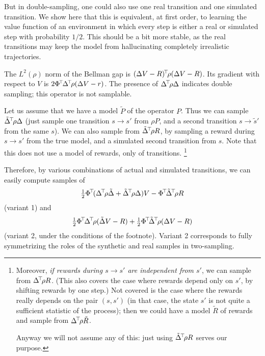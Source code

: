 \documentclass[11pt,a4paper]{article}
\begin{document}
But in double-sampling, one could also use one real transition and one
simulated transition. We show here that this is equivalent, at first order,
to learning the value function of an environment in which every step is
either a real or simulated step with probability $1/2$. This should be a
bit more stable, as the real transitions may keep the model from
hallucinating completely irrealistic trajectories.

The $L^2(\rho)$ norm of the Bellman gap is $(\Delta
V-R)^{\!\top}\!\rho(\Delta V-R)$. Its gradient with respect to $V$ is
$2\Phi^{\!\top}\!\Delta^{\!\top}\!\rho (\Delta V-r)$. The presence of
$\Delta^{\!\top}\!\rho\Delta$ indicates double sampling; this operator is
not samplable.

Let us assume that we have a model $\tilde P$ of the operator $P$. Thus
we can sample $\tilde \Delta^{\!\top}\!\rho \Delta$ (just sample one
transition $s\to s'$ from $\rho P$, and a second transition $s\to \tilde
s'$ from the same $s$). We can also sample from $\tilde
\Delta^{\!\top}\!\rho R$, by sampling a reward during $s\to s'$ from the true
model, and a simulated second
transition from $s$. Note that this does not use a model of rewards, only of
transitions.
\footnote{
Moreover, \emph{if rewards during $s\to s'$ are
independent from $s'$}, we can sample from $\Delta^{\!\top}\!\rho R$. 
(This also covers the case where rewards depend only on $s'$, by shifting
rewards by one step.) Not covered is the case where the rewards really
depends on the pair
$(s,s')$ (in that case, the state $s'$ is not quite a sufficient
statistic of the process); then we could have a model $\tilde R$ of rewards and
sample from $\Delta^{\!\top}\!\rho \tilde{R}$.

Anyway we will not assume any of this: just using
$\tilde
\Delta^{\!\top}\!\rho R$ serves our purpose.}


Therefore, by various combinations of actual and simulated transitions,
we can easily compute samples of
\begin{equation}
\tfrac12 \transp{\Phi}(\transp{\Delta}\rho \tilde \Delta+\transp{\tilde
\Delta}\rho\Delta)V
-
\transp{\Phi}\transp{\tilde \Delta}
\rho R
\end{equation}
(variant 1) and
\begin{equation}
\tfrac12 \transp{\Phi}\transp{\Delta}
\rho(\tilde \Delta V-R)
+
\tfrac12 \transp{\Phi}\transp{\tilde \Delta}
\rho(\Delta V-R)
\end{equation}
(variant 2, under the conditions of the footnote). Variant 2 corresponds
to fully symmetrizing the roles of the synthetic and real samples in
two-sampling.
\end{document}
